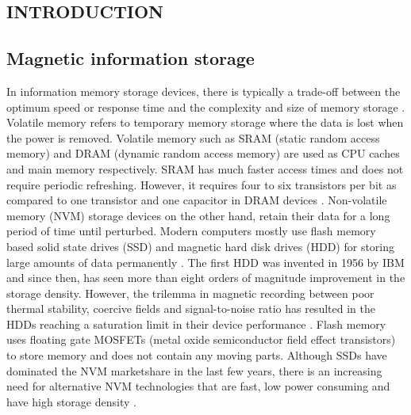 \documentclass[10pt,doublespacing,edeposit]{uiucthesis2020}
\begin{document}


\begin{mainmatter}

\chapter{INTRODUCTION}

\section{Magnetic information storage}

In information memory storage devices, there is typically a trade-off between the optimum speed or response time and the complexity and size of memory storage \cite{Wing1986}. Volatile memory refers to temporary memory storage where the data is lost when the power is removed. Volatile memory such as SRAM (static random access memory) and DRAM (dynamic random access memory) are used as CPU caches and main memory respectively. SRAM has much faster access times and does not require periodic refreshing. However, it requires four to six transistors per bit as compared to one transistor and one capacitor in DRAM devices \cite{Meena2014}. Non-volatile memory (NVM) storage devices on the other hand, retain their data for a long period of time until perturbed. Modern computers mostly use flash memory based solid state drives (SSD) and magnetic hard disk drives (HDD) for storing large amounts of data permanently \cite{Meena2014}. The first HDD was invented in 1956 by IBM and since then, has seen more than eight orders of magnitude improvement in the storage density. However, the trilemma in magnetic recording between poor thermal stability, coercive fields and signal-to-noise ratio has resulted in the HDDs reaching a saturation limit in their device performance \cite{Krishnan2016}. Flash memory uses floating gate MOSFETs (metal oxide semiconductor field effect transistors) to store memory and does not contain any moving parts. Although SSDs have dominated the NVM marketshare in the last few years, there is an increasing need for alternative NVM technologies that are fast, low power consuming and have high storage density \cite{Meena2014}.


\end{mainmatter}
\end{document}
